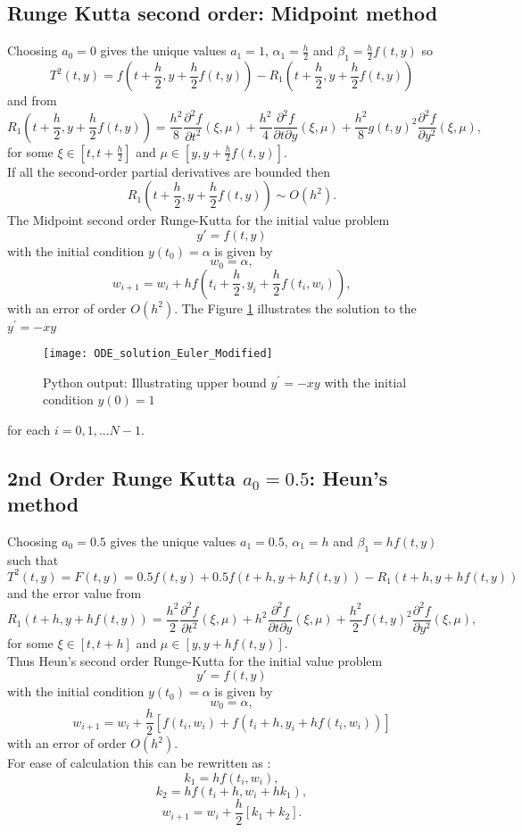 \subsection{Runge Kutta second order: Midpoint method}
Choosing $a_0=0$ gives the unique values $a_1=1$, $\alpha_1=\frac{h}{2}$ and $\beta_1=\frac{h}{2}f(t,y)$
so
\[T^{2}(t,y) = f(t+\frac{h}{2},y+\frac{h}{2}f(t,y))-R_1(t+\frac{h}{2},y+\frac{h}{2}f(t,y))
\]
and from
\[ R_1(t+\frac{h}{2},y+\frac{h}{2}f(t,y))=\frac{h^2}{8}\frac{\partial^2 f}{\partial t ^2}(\xi,\mu)
+\frac{h^2}{4} \frac{\partial^2 f}{\partial t \partial y}(\xi,\mu)
+\frac{h^2}{8}g(t,y)^2\frac{\partial^2 f}{\partial y^2} (\xi,\mu),
\]for some $\xi \in [t,t+\frac{h}{2}]$ and $\mu \in [y,y+\frac{h}{2}f(t,y)]$.\\
If all the second-order partial derivatives are bounded then
\[ R_1(t+\frac{h}{2},y+\frac{h}{2}f(t,y)) \sim O(h^2). \]
The Midpoint second order Runge-Kutta for the initial value problem
\[y'=f(t,y)\] 
with the initial condition $y(t_0)=\alpha$ is given by
\[w_0=\alpha, \]
\[w_{i+1}=w_i+hf(t_i+\frac{h}{2},y_i+\frac{h}{2}f(t_i,w_i)), \]
with an error of order $O(h^2)$.
The Figure \ref{Modified Euler Figure} illustrates the solution to the  $y^{'}=-xy$
\begin{figure}[H]
\centering
\texttt{[image: ODE\_solution\_Euler\_Modified]}
\caption{Python output: Illustrating upper bound $y^{'}=-xy$ with the initial condition $y(0)=1$ }
\label{Modified Euler Figure}
\end{figure}
for each $i=0,1,...N-1.$

\subsection{2nd Order Runge Kutta $a_0=0.5$: Heun's method}
Choosing $a_0=0.5$ gives the unique values $a_1=0.5$, $\alpha_1=h$ and $\beta_1=hf(t,y)$
such that 
\[T^{2}(t,y)=F(t,y) = 0.5 f(t,y)+0.5 f(t+h,y+hf(t,y))-R_1(t+h,y+hf(t,y))
\]
and the error value from
\[ R_1(t+h,y+hf(t,y))=\frac{h^2}{2}\frac{\partial^2 f}{\partial t ^2}(\xi,\mu)
+h^2 \frac{\partial^2 f}{\partial t \partial y}(\xi,\mu)
+\frac{h^2}{2}f(t,y)^2\frac{\partial^2 f}{\partial y^2} (\xi,\mu),
\]for some $\xi \in [t,t+h]$ and $\mu \in [y,y+hf(t,y)]$.\\

Thus Heun's second order Runge-Kutta for the initial value problem
\[y'=f(t,y)\] 
with the initial condition $y(t_0)=\alpha$ is given by
\[w_0=\alpha, \]
\[w_{i+1}=w_i+\frac{h}{2}[f(t_i,w_i)+f(t_i+h,y_i+hf(t_i,w_i))] \]
with an error of order $O(h^2)$.\\
For ease of calculation this can be rewritten as :
\[k_1=hf(t_i,w_i),\]
\[k_2=hf(t_i+h,w_i+hk_1),\]
\[w_{i+1}=w_i+\frac{h}{2}[k_1+k_2]. \]

